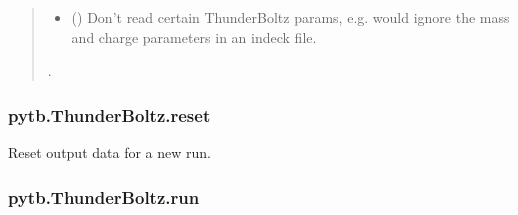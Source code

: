 \documentclass[letterpaper,10pt,english,openany,oneside]{sphinxmanual}
\begin{document}
\begin{fulllineitems}
\begin{fulllineitems}
\begin{quote}
\begin{description}
\begin{itemize}
\item {} 
\sphinxAtStartPar
{} (\sphinxstyleliteralemphasis{\sphinxupquote{{[}}}\sphinxstyleliteralemphasis{\sphinxupquote{{]}}}) \textendash{} Don’t read certain ThunderBoltz
params, e.g. \sphinxcode{\sphinxupquote{{[}"MP", "QP"{]}}} would ignore the
mass and charge parameters in an indeck file.

\end{itemize}

\sphinxAtStartPar
{}.

\sphinxAtStartPar
{}

\end{description}\end{quote}

\end{fulllineitems}


\sphinxstepscope


\subsubsection{pytb.ThunderBoltz.reset}
\label{\detokenize{api/pytb.ThunderBoltz.reset:pytb-thunderboltz-reset}}\label{\detokenize{api/pytb.ThunderBoltz.reset::doc}}

\begin{fulllineitems}
\label{\detokenize{api/pytb.ThunderBoltz.reset:pytb.ThunderBoltz.reset}}
\pysigstartsignatures
{}
\pysigstopsignatures
\sphinxAtStartPar
Reset output data for a new run.

\end{fulllineitems}


\sphinxstepscope


\subsubsection{pytb.ThunderBoltz.run}
\label{\detokenize{api/pytb.ThunderBoltz.run:pytb-thunderboltz-run}}\label{\detokenize{api/pytb.ThunderBoltz.run::doc}}


\end{fulllineitems}
\end{document}
